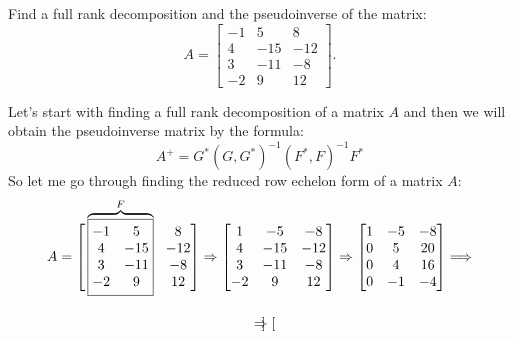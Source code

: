 \documentclass[12pt]{report}
\begin{document}
\begin{problem}{}
  Find a full rank decomposition and the pseudoinverse of the matrix:
  \[
      A = \begin{bmatrix}
         -1 & 5 & 8\\
         4 & -15 & -12\\
         3 & -11 & -8\\
         -2 & 9 & 12
      \end{bmatrix}.
  \]
\end{problem}

\begin{solution}
   Let's start with finding a full rank decomposition of a matrix $A$ and then we will obtain the pseudoinverse matrix by the formula:
   \[
        A^+ = G^*(G,G^*)^{-1}(F^*,F)^{-1}F^* 
   \]
   So let me go through finding the reduced row echelon form of a matrix $A$:
   \[
      \begin{array}{c}
         \displaystyle A = \Vast[
            \overbrace{\fbox{$\begin{matrix}
                -1 & 5 \\
                4 & -15 \\
                3 & -11 \\
                -2 & 9
            \end{matrix}$}}^{F} \hspace*{0.25cm} \begin{matrix}
                8 \\
                -12 \\
                -8 \\
                12
            \end{matrix}\Vast] \Rightarrow \begin{bmatrix}
            1 & -5 & -8\\
            4 & -15 & -12\\
            3 & -11 & -8\\
            -2 & 9 & 12
         \end{bmatrix} \Rightarrow \begin{bmatrix}
            1 & -5 & -8\\
            0 & 5 & 20\\
            0 & 4 & 16\\
            0 & -1 & -4
         \end{bmatrix} \Longrightarrow \\[1.25cm]
         \displaystyle \Rightarrow \begin{bmatrix}

\end{bmatrix}
\end{array}\]
\end{solution}
\end{document}
